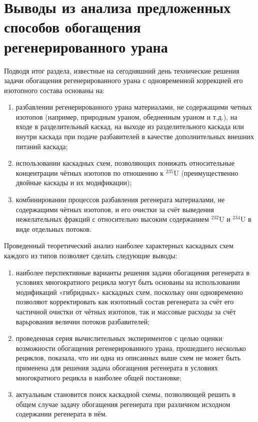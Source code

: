 \section{Выводы из анализа предложенных способов обогащения регенерированного урана}

Подводя итог раздела, известные на сегодняшний день технические решения задачи обогащения регенерированного урана с одновременной коррекцией его изотопного состава основаны на:
\begin{enumerate}
  \item разбавлении регенерированного урана материалами, не содержащими четных изотопов (например, природным ураном, обедненным ураном и т.д.), на входе в разделительный каскад, на выходе из разделительного каскада или внутри каскада при подаче разбавителей в качестве дополнительных внешних питаний каскада;
  \item использовании каскадных схем, позволяющих понижать относительные концентрации чётных изотопов по отношению к $^{235}$U (преимущественно двойные каскады и их модификации);
  \item комбинировании процессов разбавления регенерата материалами, не содержащими чётных изотопов, и его очистки за счёт выведения нежелательных фракций с относительно высоким содержанием $^{232}$U и $^{234}$U в виде отдельных потоков.
\end{enumerate}

Проведенный теоретический анализ наиболее характерных каскадных схем каждого из типов позволяет сделать следующие выводы:
\begin{enumerate}
  \item наиболее перспективные варианты решения задачи обогащения регенерата в условиях многократного рецикла могут быть основаны на использовании модификаций «гибридных» каскадных схем, поскольку они одновременно позволяют корректировать как изотопный состав регенерата за счёт его частичной очистки от чётных изотопов, так и массовые расходы за счёт варьрования величин потоков разбавителей;
  \item проведенная серия вычислительных экспериментов с целью оценки возможности обогащения регенерированного урана, прошедшего несколько рециклов, показала, что ни одна из описанных выше схем не может быть применена для решения задача обогащения регенерата в условиях многократного рецикла в наиболее общей постановке;
  \item актуальным становится поиск каскадной схемы, позволяющей решить в общем случае задачу обогащения регенерата при различном исходном содержании регенерата в нём.
\end{enumerate}